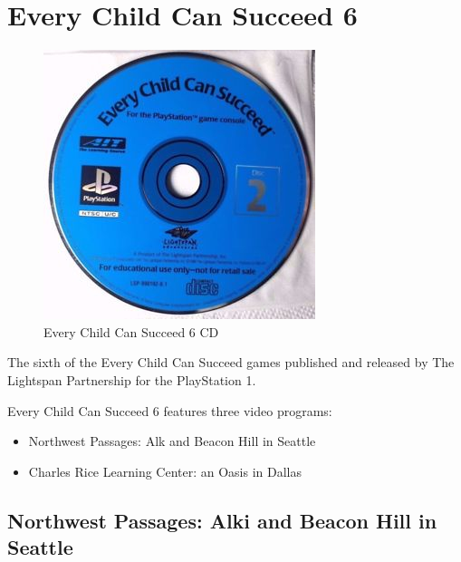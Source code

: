 \chapter{Every Child Can Succeed 6}

\begin{figure}[H]
    \centering
    \includegraphics[width=\textwidth/2]{./Games/EveryChildCanSucceed/Images/EveryChildCanSucceed6CD.jpg}
    \caption{Every Child Can Succeed 6 CD}
\end{figure}

The sixth of the Every Child Can Succeed games published and released by The Lightspan Partnership for the PlayStation 1.

Every Child Can Succeed 6 features three video programs:

\begin{itemize}
    \item Northwest Passages: Alk and Beacon Hill in Seattle
    \item Charles Rice Learning Center: an Oasis in Dallas
\end{itemize}

\clearpage
\newpage

\section{Northwest Passages: Alki and Beacon Hill in Seattle}

